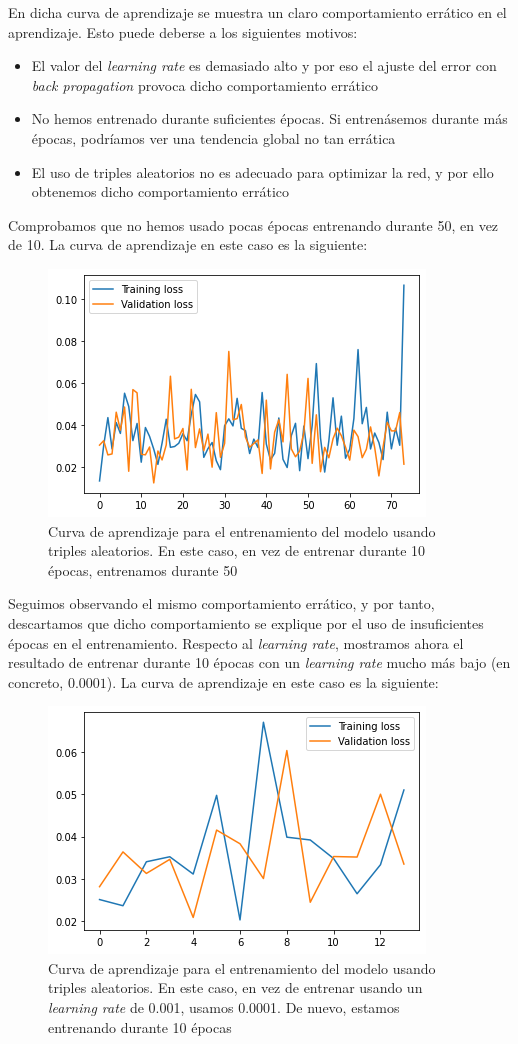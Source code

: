\documentclass[11pt]{article}
\begin{document}
En dicha curva de aprendizaje se muestra un claro comportamiento errático en el aprendizaje. Esto puede deberse a los siguientes motivos:

\begin{itemize}
  \item El valor del \emph{learning rate} es demasiado alto y por eso el ajuste del error con \emph{back propagation} provoca dicho comportamiento errático
  \item No hemos entrenado durante suficientes épocas. Si entrenásemos durante más épocas, podríamos ver una tendencia global no tan errática
  \item El uso de triples aleatorios no es adecuado para optimizar la red, y por ello obtenemos dicho comportamiento errático
\end{itemize}

Comprobamos que no hemos usado pocas épocas entrenando durante 50, en vez de 10. La curva de aprendizaje en este caso es la siguiente:

\begin{figure}[H]
    \centering
    \includegraphics[width = 0.4 \textwidth]{random_curva_aprendizaje_larga}
    \caption{Curva de aprendizaje para el entrenamiento del modelo usando triples aleatorios. En este caso, en vez de entrenar durante 10 épocas, entrenamos durante 50}
\end{figure}

Seguimos observando el mismo comportamiento errático, y por tanto, descartamos que dicho comportamiento se explique por el uso de insuficientes épocas en el entrenamiento. Respecto al \emph{learning rate}, mostramos ahora el resultado de entrenar durante 10 épocas con un \emph{learning rate} mucho más bajo (en concreto, $0.0001$). La curva de aprendizaje en este caso es la siguiente:

\begin{figure}[H]
    \centering
    \includegraphics[width = 0.4 \textwidth]{random_curva_aprendizaje_lrbajo}
    \caption{Curva de aprendizaje para el entrenamiento del modelo usando triples aleatorios. En este caso, en vez de entrenar usando un \emph{learning rate} de 0.001, usamos 0.0001. De nuevo, estamos entrenando durante 10 épocas}
\end{figure}
\end{document}
